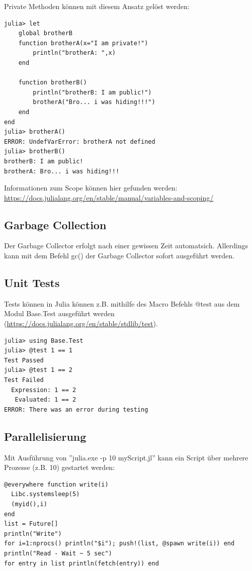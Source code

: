 \documentclass[11pt]{article}
\begin{document}
\noindent\begin{minipage}{\textwidth}
Private Methoden können mit diesem Ansatz gelöst werden:
\begin{lstlisting}
julia> let
	global brotherB
	function brotherA(x="I am private!")
		println("brotherA: ",x)
	end

	function brotherB()
		println("brotherB: I am public!")
		brotherA("Bro... i was hiding!!!")
	end
end
julia> brotherA()
ERROR: UndefVarError: brotherA not defined
julia> brotherB()
brotherB: I am public!
brotherA: Bro... i was hiding!!!
\end{lstlisting}
\end{minipage}

Informationen zum Scope können hier gefunden werden: \url{https://docs.julialang.org/en/stable/manual/variables-and-scoping/}

\subsection{Garbage Collection}
Der Garbage Collector erfolgt nach einer gewissen Zeit automatsich. Allerdings kann mit dem Befehl gc() der Garbage Collector sofort ausgeführt werden.

\subsection{Unit Tests}
\noindent\begin{minipage}{\textwidth}
Tests können in Julia können z.B. mithilfe des Macro Befehls @test aus dem Modul Base.Test ausgeführt werden (\url{https://docs.julialang.org/en/stable/stdlib/test}).
\begin{lstlisting}
julia> using Base.Test
julia> @test 1 == 1
Test Passed
julia> @test 1 == 2
Test Failed
  Expression: 1 == 2
   Evaluated: 1 == 2
ERROR: There was an error during testing
\end{lstlisting}
\end{minipage}

\subsection{Parallelisierung}

\noindent\begin{minipage}{\textwidth}
Mit Ausführung von ''julia.exe -p 10 myScript.jl'' kann ein Script über mehrere Prozesse (z.B. 10) gestartet werden:
\begin{lstlisting}
@everywhere function write(i)
  Libc.systemsleep(5)
  (myid(),i)
end
list = Future[]
println("Write")
for i=1:nprocs() println("$i"); push!(list, @spawn write(i)) end
println("Read - Wait ~ 5 sec")
for entry in list println(fetch(entry)) end
\end{lstlisting}
\end{minipage}
\end{document}
